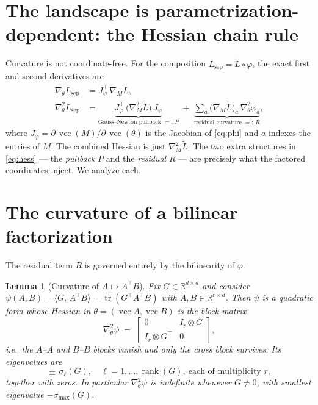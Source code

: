 \documentclass[11pt]{article}
\newtheorem{lemma}{Lemma}
\theoremstyle{remark}
\newcommand{\R}{\mathbb{R}}
\newcommand{\tr}{\operatorname{tr}}
\newcommand{\vecop}{\operatorname{vec}}
\newcommand{\Hess}{\nabla^2}
\DeclareMathOperator{\rank}{rank}
\begin{document}
\section{The landscape is parametrization-dependent: the Hessian chain rule}

Curvature is not coordinate-free. For the composition
$L_{\mathrm{sep}}=\widetilde L\circ\varphi$, the exact first and second
derivatives are
\begin{align}
\nabla_\theta L_{\mathrm{sep}}
   &= J_\varphi^{\!\top}\,\nabla_M\widetilde L, \label{eq:grad}\\[2pt]
\Hess_\theta L_{\mathrm{sep}}
   &= \underbrace{J_\varphi^{\!\top}\,\bigl(\Hess_M\widetilde L\bigr)\,J_\varphi}
        _{\textstyle \text{Gauss--Newton pullback }=:\,P}
     \;+\;
      \underbrace{\sum_{a}\bigl(\nabla_M\widetilde L\bigr)_a\,\Hess_\theta\varphi_a}
        _{\textstyle \text{residual curvature }=:\,R}, \label{eq:hess}
\end{align}
where $J_\varphi=\partial\,\vecop(M)/\partial\,\vecop(\theta)$ is the Jacobian of
\eqref{eq:phi} and $a$ indexes the entries of $M$. The combined Hessian is just
$\Hess_M\widetilde L$. The two extra structures in \eqref{eq:hess} --- the
\emph{pullback} $P$ and the \emph{residual} $R$ --- are precisely what the
factored coordinates inject. We analyze each.

\section{The curvature of a bilinear factorization}

The residual term $R$ is governed entirely by the bilinearity of $\varphi$.

\begin{lemma}[Curvature of $A\mapsto A^{\!\top}B$]\label{lem:bilin}
Fix $G\in\R^{d\times d}$ and consider $\psi(A,B)=\langle G,\,A^{\!\top}B\rangle
=\tr(G^{\!\top}A^{\!\top}B)$ with $A,B\in\R^{r\times d}$. Then $\psi$ is a quadratic
form whose Hessian in $\theta=(\vecop A,\vecop B)$ is the block matrix
\begin{equation}\label{eq:Rblock}
\Hess_\theta\psi \;=\;
\begin{bmatrix} 0 & I_r\otimes G\\[2pt] I_r\otimes G^{\!\top} & 0\end{bmatrix},
\end{equation}
i.e.\ the $A$--$A$ and $B$--$B$ blocks vanish and only the cross block survives.
Its eigenvalues are
\[
\boxed{\;\pm\,\sigma_\ell(G),\quad \ell=1,\dots,\rank(G),\ \text{each of multiplicity }r,\;}
\]
together with zeros. In particular $\Hess_\theta\psi$ is \emph{indefinite}
whenever $G\neq 0$, with smallest eigenvalue $-\sigma_{\max}(G)$.
\end{lemma}
\end{document}
